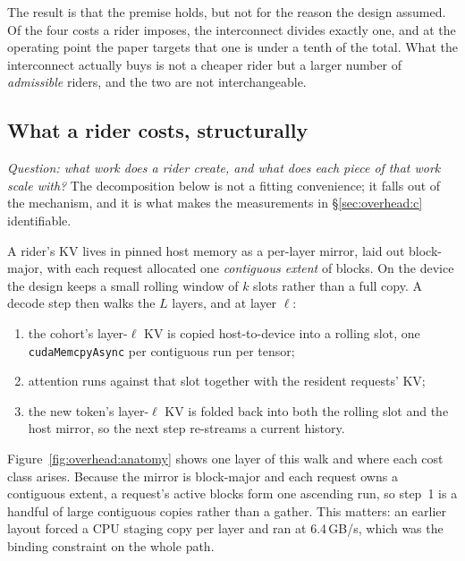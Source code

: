 The result is that the premise holds, but not for the reason the design assumed.
Of the four costs a rider imposes, the interconnect divides exactly one, and at
the operating point the paper targets that one is under a tenth of the total.
What the interconnect actually buys is not a cheaper rider but a larger number
of \emph{admissible} riders, and the two are not interchangeable.

\subsection{What a rider costs, structurally}
\label{sec:overhead:anatomy}

\emph{Question: what work does a rider create, and what does each piece of that
work scale with?} The decomposition below is not a fitting convenience; it falls
out of the mechanism, and it is what makes the measurements in
\S\ref{sec:overhead:c} identifiable.

A rider's KV lives in pinned host memory as a per-layer mirror, laid out
block-major, with each request allocated one \emph{contiguous extent} of blocks.
On the device the design keeps a small rolling window of $k$ slots rather than a
full copy. A decode step then walks the $L$ layers, and at layer $\ell$:

\begin{enumerate}
\itemsep2pt
\item the cohort's layer-$\ell$ KV is copied host-to-device into a rolling slot,
      one \texttt{cudaMemcpyAsync} per contiguous run per tensor;
\item attention runs against that slot together with the resident requests' KV;
\item the new token's layer-$\ell$ KV is folded back into both the rolling slot
      and the host mirror, so the next step re-streams a current history.
\end{enumerate}

Figure~\ref{fig:overhead:anatomy} shows one layer of this walk and where each
cost class arises. Because the mirror is block-major and each request owns a
contiguous extent, a request's active blocks form one ascending run, so step~1
is a handful of large contiguous copies rather than a gather. This matters: an
earlier layout forced a CPU staging copy per layer and ran at 6.4\,GB/s, which
was the binding constraint on the whole path.

